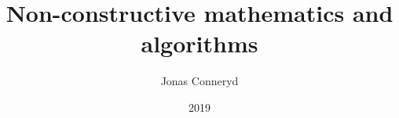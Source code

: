 %
%


\usepackage{csquotes}

\title{Non-constructive mathematics and algorithms}


\author{Jonas Conneryd}


\date{2019}


